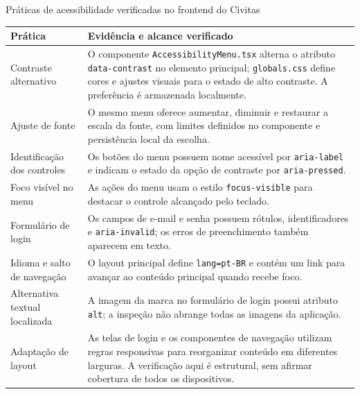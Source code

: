 \begin{quadro}[H]
\caption{Práticas de acessibilidade verificadas no frontend do Civitas}\label{qua:cap4-acessibilidade}
\small
\begin{tabularx}{\textwidth}{|P{.22\textwidth}|>{\RaggedRight\arraybackslash}X|}
\hline
\textbf{Prática} & \textbf{Evidência e alcance verificado} \\ \hline
Contraste alternativo & O componente \texttt{AccessibilityMenu.tsx} alterna o atributo \texttt{data-contrast} no elemento principal; \texttt{globals.css} define cores e ajustes visuais para o estado de alto contraste. A preferência é armazenada localmente. \\ \hline
Ajuste de fonte & O mesmo menu oferece aumentar, diminuir e restaurar a escala da fonte, com limites definidos no componente e persistência local da escolha. \\ \hline
Identificação dos controles & Os botões do menu possuem nome acessível por \texttt{aria-label} e indicam o estado da opção de contraste por \texttt{aria-pressed}. \\ \hline
Foco visível no menu & As ações do menu usam o estilo \texttt{focus-visible} para destacar o controle alcançado pelo teclado. \\ \hline
Formulário de login & Os campos de e-mail e senha possuem rótulos, identificadores e \texttt{aria-invalid}; os erros de preenchimento também aparecem em texto. \\ \hline
Idioma e salto de navegação & O layout principal define \texttt{lang=pt-BR} e contém um link para avançar ao conteúdo principal quando recebe foco. \\ \hline
Alternativa textual localizada & A imagem da marca no formulário de login possui atributo \texttt{alt}; a inspeção não abrange todas as imagens da aplicação. \\ \hline
Adaptação de layout & As telas de login e os componentes de navegação utilizam regras responsivas para reorganizar conteúdo em diferentes larguras. A verificação aqui é estrutural, sem afirmar cobertura de todos os dispositivos. \\ \hline
\end{tabularx}
\end{quadro}
